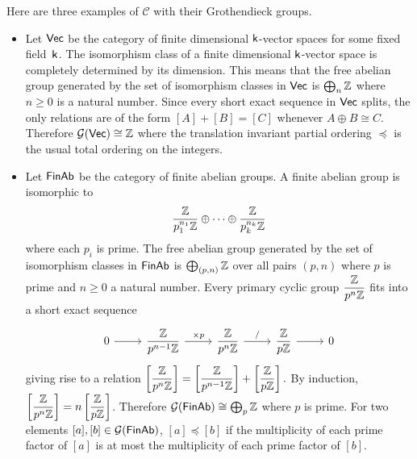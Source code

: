 \documentclass[12pt]{article}
\begin{document}
\begin{ex}
Here are three examples of $\mathcal{C}$ with their Grothendieck groups.
	\begin{itemize}
	\item Let ${\mathsf{Vec}}$ be the category of finite dimensional $\mathsf{k}$-vector spaces
	for some fixed field~$\mathsf{k}$.
	The isomorphism class of a finite dimensional $\mathsf{k}$-vector space is completely determined
	by its dimension. 
	This means that the free abelian group generated by the set of isomorphism classes in 
	${\mathsf{Vec}}$ is $\bigoplus_{n} {\mathbb Z}$ where $n \geq 0$ is a natural number.
	Since every short exact sequence in ${\mathsf{Vec}}$ splits, the only relations are of the form $[A] + [B] = [C]$ whenever $A \oplus B \cong C$.
	Therefore ${\mathcal{G}} ({\mathsf{Vec}}) \cong {\mathbb Z}$ where the translation invariant partial 
	ordering $\preceq$ is the usual total ordering on the integers.
	
	\item Let ${\mathsf{FinAb}}$ be the category of finite abelian groups.
	A finite abelian group is isomorphic to
		$$\dfrac{{\mathbb Z}}{p_1^{n_1} {\mathbb Z}} \oplus \cdots \oplus
		 			\dfrac{{\mathbb Z}}{p_k^{n_k} {\mathbb Z}}$$
	where each $p_i$ is prime.
	The free abelian group generated by the set of isomorphism classes in ${\mathsf{FinAb}}$
	is $\bigoplus_{(p,n)} {\mathbb Z}$
	over all pairs $(p, n)$ where $p$ is prime and $n \geq 0$ a natural number.
	Every primary cyclic group $\dfrac{{\mathbb Z}}{p^n {\mathbb Z}}$ fits into a short exact sequence
		\begin{equation*}
		\begin{tikzcd}
		0 \arrow[r] & \dfrac{\Zspace}{p^{n-1} \Zspace} \arrow[r, "\times p"] & 
		\dfrac{\Zspace}{p^{n} \Zspace} \arrow[r, "/"] &
		\dfrac{\Zspace}{p\Zspace} \arrow[r] & 0
		\end{tikzcd}
		\end{equation*}
	giving rise to a relation
	$\left[ \dfrac{{\mathbb Z}}{p^{n} {\mathbb Z}} \right] = 
	\left[ \dfrac{{\mathbb Z}}{p^{n-1} {\mathbb Z}} \right] + \left[ \dfrac{{\mathbb Z}}{p {\mathbb Z}} \right].$
	By induction, $\left[ \dfrac{{\mathbb Z}}{p^{n} {\mathbb Z}} \right] = n \left[ \dfrac{{\mathbb Z}}{p {\mathbb Z}} \right]$.
	Therefore ${\mathcal{G}}( {\mathsf{FinAb}} ) \cong \bigoplus_p {\mathbb Z}$ where $p$ is prime.
	For two elements $[a], [b] \in {\mathcal{G}}( {\mathsf{FinAb}} )$, $[a] \preceq [b]$ 
	if the multiplicity of each prime factor of $[a]$ is at most the multiplicity of each
	prime factor of $[b]$.
	

\end{itemize}
\end{ex}
\end{document}
